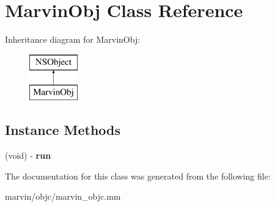 \hypertarget{interface_marvin_obj}{}\section{Marvin\+Obj Class Reference}
\label{interface_marvin_obj}
Inheritance diagram for Marvin\+Obj\+:\begin{figure}[H]
\begin{center}
\leavevmode
\includegraphics[height=2.000000cm]{interface_marvin_obj}
\end{center}
\end{figure}
\subsection*{Instance Methods}
\begin{DoxyCompactItemize}
\item 
\mbox{\label{interface_marvin_obj_a7b93b5ebbd36b83ac6264f5b024ed5cc}} 
(void) -\/ {\bfseries run}
\end{DoxyCompactItemize}


The documentation for this class was generated from the following file\+:\begin{DoxyCompactItemize}
\item 
marvin/objc/marvin\+\_\+objc.\+mm\end{DoxyCompactItemize}
